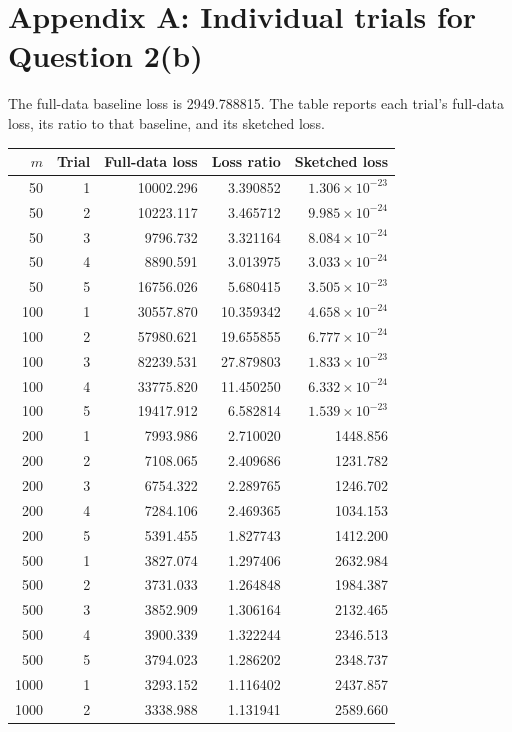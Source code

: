 \documentclass[11pt,a4paper]{article}
\begin{document}
\section*{Appendix A: Individual trials for Question 2(b)}
The full-data baseline loss is 2949.788815. The table reports each
trial's full-data loss, its ratio to that baseline, and its sketched loss.
\begin{center}
\footnotesize
\setlength{\tabcolsep}{10pt}
\begin{tabular}{rrrrr}
\toprule
$m$ & Trial & Full-data loss & Loss ratio & Sketched loss \\
\midrule
50 & 1 & 10002.296 & 3.390852 & $1.306\times10^{-23}$ \\
50 & 2 & 10223.117 & 3.465712 & $9.985\times10^{-24}$ \\
50 & 3 & 9796.732 & 3.321164 & $8.084\times10^{-24}$ \\
50 & 4 & 8890.591 & 3.013975 & $3.033\times10^{-24}$ \\
50 & 5 & 16756.026 & 5.680415 & $3.505\times10^{-23}$ \\
100 & 1 & 30557.870 & 10.359342 & $4.658\times10^{-24}$ \\
100 & 2 & 57980.621 & 19.655855 & $6.777\times10^{-24}$ \\
100 & 3 & 82239.531 & 27.879803 & $1.833\times10^{-23}$ \\
100 & 4 & 33775.820 & 11.450250 & $6.332\times10^{-24}$ \\
100 & 5 & 19417.912 & 6.582814 & $1.539\times10^{-23}$ \\
200 & 1 & 7993.986 & 2.710020 & 1448.856 \\
200 & 2 & 7108.065 & 2.409686 & 1231.782 \\
200 & 3 & 6754.322 & 2.289765 & 1246.702 \\
200 & 4 & 7284.106 & 2.469365 & 1034.153 \\
200 & 5 & 5391.455 & 1.827743 & 1412.200 \\
500 & 1 & 3827.074 & 1.297406 & 2632.984 \\
500 & 2 & 3731.033 & 1.264848 & 1984.387 \\
500 & 3 & 3852.909 & 1.306164 & 2132.465 \\
500 & 4 & 3900.339 & 1.322244 & 2346.513 \\
500 & 5 & 3794.023 & 1.286202 & 2348.737 \\
1000 & 1 & 3293.152 & 1.116402 & 2437.857 \\
1000 & 2 & 3338.988 & 1.131941 & 2589.660 \\

\end{tabular}
\end{center}
\end{document}
